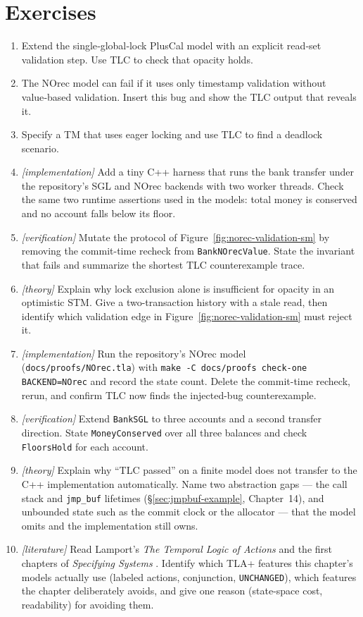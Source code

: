 \section{Exercises}
\begin{enumerate}
    \item Extend the single‑global‑lock PlusCal model with an explicit read‑set validation step. Use TLC to check that opacity holds.
    \item The NOrec model can fail if it uses only timestamp validation without value‑based validation. Insert this bug and show the TLC output that reveals it.
    \item Specify a TM that uses eager locking and use TLC to find a deadlock scenario.
    \item \emph{[implementation]} Add a tiny C++ harness that runs the bank transfer under the repository's SGL and NOrec backends with two worker threads. Check the same two runtime assertions used in the models: total money is conserved and no account falls below its floor.
    \item \emph{[verification]} Mutate the protocol of Figure~\ref{fig:norec-validation-sm} by removing the commit-time recheck from \texttt{BankNOrecValue}. State the invariant that fails and summarize the shortest TLC counterexample trace.
    \item \emph{[theory]} Explain why lock exclusion alone is insufficient for opacity in an optimistic STM. Give a two-transaction history with a stale read, then identify which validation edge in Figure~\ref{fig:norec-validation-sm} must reject it.
    \item \emph{[implementation]} Run the repository's NOrec model
          (\texttt{docs/proofs/NOrec.tla}) with
          \texttt{make -C docs/proofs check-one BACKEND=NOrec} and record
          the state count.  Delete the commit-time recheck, rerun, and
          confirm TLC now finds the injected-bug counterexample.
    \item \emph{[verification]} Extend \texttt{BankSGL} to three accounts
          and a second transfer direction.  State
          \texttt{MoneyConserved} over all three balances and check
          \texttt{FloorsHold} for each account.
    \item \emph{[theory]} Explain why ``TLC passed'' on a finite model does
          not transfer to the C++ implementation automatically.  Name two
          abstraction gaps --- the call stack and \texttt{jmp\_buf}
          lifetimes (\S\ref{sec:jmpbuf-example}, Chapter~14), and unbounded state such
          as the commit clock or the allocator --- that the model omits and
          the implementation still owns.
    \item \emph{[literature]} Read Lamport's \emph{The Temporal Logic of
          Actions} \cite{lamport94tla} and the first chapters of
          \emph{Specifying Systems} \cite{lamport02specifying}.  Identify
          which TLA+ features this chapter's models actually use
          (labeled actions, conjunction, \texttt{UNCHANGED}), which
          features the chapter deliberately avoids, and give one reason
          (state-space cost, readability) for avoiding them.
\end{enumerate}

